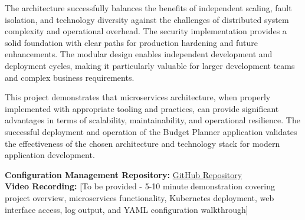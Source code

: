 \documentclass[conference]{IEEEtran}
\begin{document}
The architecture successfully balances the benefits of independent scaling, fault isolation, and technology diversity against the challenges of distributed system complexity and operational overhead. The security implementation provides a solid foundation with clear paths for production hardening and future enhancements. The modular design enables independent development and deployment cycles, making it particularly valuable for larger development teams and complex business requirements.

This project demonstrates that microservices architecture, when properly implemented with appropriate tooling and practices, can provide significant advantages in terms of scalability, maintainability, and operational resilience. The successful deployment and operation of the Budget Planner application validates the effectiveness of the chosen architecture and technology stack for modern application development.

\vspace{1mm}
\noindent\textbf{Configuration Management Repository: }
\href{https://github.com/md-d-cdr-4304/budget-planner}{GitHub Repository}\\
\noindent\textbf{Video Recording: } [To be provided - 5-10 minute demonstration covering project overview, microservices functionality, Kubernetes deployment, web interface access, log output, and YAML configuration walkthrough]

\end{document}
